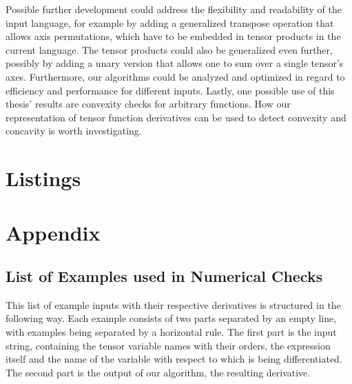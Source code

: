 \documentclass[12pt, a4paper]{report}
\begin{document}
Possible further development could address the flexibility and readability of the input language, for example by adding a generalized transpose operation that allows axis permutations, which have to be embedded in tensor products in the current language.
The tensor products could also be generalized even further, possibly by adding a unary version that allows one to sum over a single tensor's axes.
Furthermore, our algorithms could be analyzed and optimized in regard to efficiency and performance for different inputs.
Lastly, one possible use of this thesis' results are convexity checks for arbitrary functions.
How our representation of tensor function derivatives can be used to detect convexity and concavity is worth investigating.

\cleardoublepage
\printbibliography
{}

\clearpage
\chapter*{Listings}\vspace{-50pt}
\listoffigures
\listoftables
\listofalgorithms

\cleardoublepage
\chapter*{Appendix}
\section*{List of Examples used in Numerical Checks}
This list of example inputs with their respective derivatives is structured in the following way.
Each example consists of two parts separated by an empty line, with examples being separated by a horizontal rule.
The first part is the input string, containing the tensor variable names with their orders, the expression itself and the name of the variable with respect to which is being differentiated.
The second part is the output of our algorithm, the resulting derivative.
\end{document}
